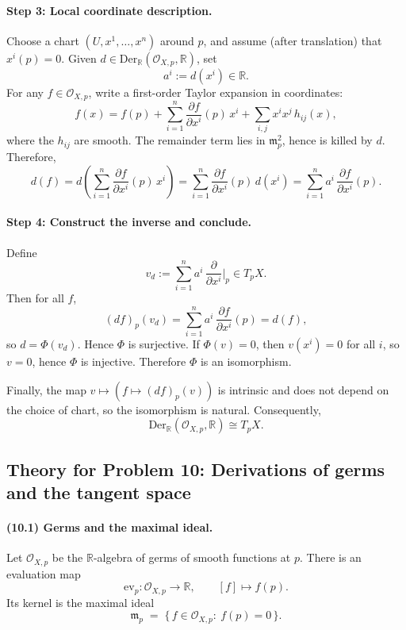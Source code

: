 \documentclass[12pt,a4paper]{article}
\theoremstyle{plain}
\theoremstyle{definition}      %
\begin{document}
\paragraph{Step 3: Local coordinate description.}
Choose a chart $(U,x^1,\dots,x^n)$ around $p$, and assume (after translation) that $x^i(p)=0$.
Given $d\in \mathrm{Der}_{\mathbb{R}}(\mathcal{O}_{X,p},\mathbb{R})$, set
\[
a^i := d(x^i)\in \mathbb{R}.
\]
For any $f\in\mathcal{O}_{X,p}$, write a first-order Taylor expansion in coordinates:
\[
f(x)=f(p)+\sum_{i=1}^n \frac{\partial f}{\partial x^i}(p)\,x^i + \sum_{i,j} x^i x^j\,h_{ij}(x),
\]
where the $h_{ij}$ are smooth. The remainder term lies in $\mathfrak{m}_p^2$, hence is killed by $d$.
Therefore,
\[
d(f)= d\!\left(\sum_{i=1}^n \frac{\partial f}{\partial x^i}(p)\,x^i\right)
=\sum_{i=1}^n \frac{\partial f}{\partial x^i}(p)\,d(x^i)
=\sum_{i=1}^n a^i\,\frac{\partial f}{\partial x^i}(p).
\]

\paragraph{Step 4: Construct the inverse and conclude.}
Define
\[
v_d := \sum_{i=1}^n a^i\,\frac{\partial}{\partial x^i}\Big|_p \in T_pX.
\]
Then for all $f$,
\[
(df)_p(v_d)=\sum_{i=1}^n a^i\,\frac{\partial f}{\partial x^i}(p)=d(f),
\]
so $d=\Phi(v_d)$. Hence $\Phi$ is surjective. If $\Phi(v)=0$, then $v(x^i)=0$ for all $i$,
so $v=0$, hence $\Phi$ is injective. Therefore $\Phi$ is an isomorphism.

Finally, the map $v\mapsto (f\mapsto (df)_p(v))$ is intrinsic and does not depend on the choice of chart,
so the isomorphism is natural. Consequently,
\[
\mathrm{Der}_{\mathbb{R}}(\mathcal{O}_{X,p},\mathbb{R}) \cong T_pX.
\]


\subsection*{Theory for Problem 10: Derivations of germs and the tangent space}

\paragraph{(10.1) Germs and the maximal ideal.}
Let $\mathcal{O}_{X,p}$ be the $\mathbb{R}$-algebra of germs of smooth functions at $p$.
There is an evaluation map
\[
\mathrm{ev}_p:\mathcal{O}_{X,p}\to \mathbb{R},\qquad [f]\mapsto f(p).
\]
Its kernel is the maximal ideal
\[
\mathfrak{m}_p \;=\; \{\,f\in \mathcal{O}_{X,p}:\ f(p)=0\,\}.
\]
\end{document}
